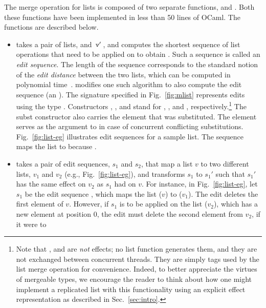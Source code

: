 \noindent The merge operation for lists is composed of two separate functions,
 and . Both these functions have been
implemented in less than 50 lines of OCaml.  The functions are described below.
\begin{itemize}
	\item {} takes a pair of lists,  and $\,{\tt v'}\,$, and computes
		the shortest sequence of list operations that need to be applied on 
		to obtain . Such a sequence is called an \emph{edit sequence}. The
		length of the sequence corresponds to the standard notion of the \emph{edit
		distance} between the two lists, which can be computed in polynomial
		time~\cite{wagner-fischer}.   modifies one such algorithm to
		also compute the edit sequence (an ). The signature
		specified in Fig.~\ref{fig:mlist} represents edits using the type
		.  Constructors , , and  stand for ,
		, and , respectively.\footnote{ Note that , 
		and  are \emph{not} effects; no list function generates them, and
		they are not exchanged between concurrent threads. They are simply tags
		used by the list merge operation for convenience.  Indeed, to better
		appreciate the virtues of mergeable types, we encourage the reader to
		think about how one might implement a replicated list with this
		functionality using an explicit effect representation as described in
		Sec.~\ref{sec:intro}.}  The subst constructor also carries the 
		element that was substituted. The element serves as the  argument to
		 in case of concurrent conflicting substitutions.
		Fig.~\ref{fig:list-eg} illustrates edit sequences for a sample list.  The
		sequence \C{[I(c,0); S(3,c,s)]} maps the list \C{[a;b;c]} to \C{[c;a;b;s]}
		because .
	\item  {} takes a pair of edit sequences, $s_1$ and $s_2$,
		that map a list $v$ to two different lists, $v_1$ and $v_2$ (e.g.,
		Fig.~\ref{fig:list-eg}), and transforms $s_1$ to $s_1'$ such that $s_1'$
		has the same effect on $v_2$ as $s_1$ had on $v$.  For instance, in
		Fig.~\ref{fig:list-eg}, let $s_1$ be the edit sequence \C{[D(1); S(1,c,d)]},
		which maps the list \C{[a;b;c]} ($v$) to \C{[a;d]} ($v_1$). The  edit
		deletes the first element of $v$. However, if $s_1$ is to be applied on the
		list \C{[c;a;b;s]} ($v_2$), which has a new element at position 0, the
		 edit must delete the second element from $v_2$, if it were to

\end{itemize}
